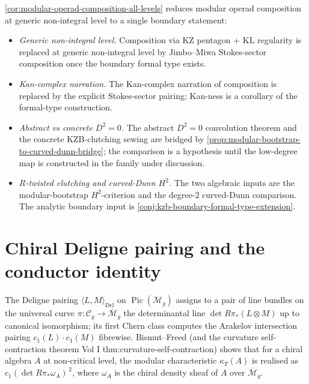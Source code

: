 \begin{remark}
\label{rem:what-closes}
\autoref{cor:modular-operad-composition-all-levels} reduces
modular operad composition at generic non-integral level to a
single boundary statement:
\begin{itemize}
 \item \emph{Generic non-integral level.} Composition via KZ
 pentagon + KL regularity is replaced at generic non-integral
 level by Jimbo--Miwa Stokes-sector composition once the
 boundary formal type exists.
 \item \emph{Kan-complex narration.} The Kan-complex narration of
 composition is replaced by the explicit Stokes-sector pairing;
 Kan-ness is a corollary of the formal-type construction.
 \item \emph{Abstract vs concrete $D^2=0$.} The abstract
 \(D^{2}=0\) convolution theorem and the concrete KZB-clutching
 sewing are bridged by
 \autoref{prop:modular-bootstrap-to-curved-dunn-bridge}; the
 comparison is a hypothesis until the low-degree map is constructed
 in the family under discussion.
 \item \emph{$R$-twisted clutching and curved-Dunn $H^2$.} The two
 algebraic inputs are the modular-bootstrap \(H^{2}\)-criterion and
 the degree-\(2\) curved-Dunn comparison. The analytic boundary
 input is \autoref{conj:kzb-boundary-formal-type-extension}.
\end{itemize}
\end{remark}

\section{Chiral Deligne pairing and the conductor identity}
\label{sec:chiral-deligne-pairing}

The Deligne pairing \(\langle L, M\rangle_{\mathrm{Del}}\)
on \(\operatorname{Pic}(\overline{\mathcal{M}}_{g})\) assigns to a pair
of line bundles on the universal curve \(\pi : \mathcal{C}_{g} \to
\overline{\mathcal{M}}_{g}\) the determinantal line
\(\det R\pi_{*}(L \otimes M)\) up to canonical isomorphism; its first
Chern class computes the Arakelov intersection pairing
\(c_{1}(L) \cdot c_{1}(M)\) fibrewise. Bismut--Freed (and the
curvature self-contraction theorem Vol I
\textup{thm:curvature-self-contraction}) shows that for a chiral
algebra \(A\) at non-critical level, the modular characteristic
\(\kappa_{T}(A)\) is realised as
\(c_{1}(\det R\pi_{*}\omega_{A})^{\,2}\), where
\(\omega_{A}\) is the chiral density sheaf of \(A\) over
\(\overline{\mathcal{M}}_{g}\).

